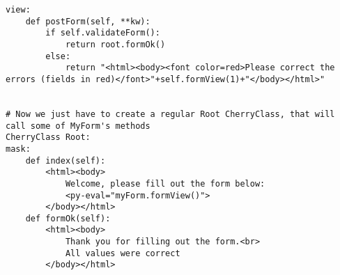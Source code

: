 \begin{verbatim}
view:
    def postForm(self, **kw):
        if self.validateForm():
            return root.formOk()
        else:
            return "<html><body><font color=red>Please correct the errors (fields in red)</font>"+self.formView(1)+"</body></html>"


# Now we just have to create a regular Root CherryClass, that will call some of MyForm's methods
CherryClass Root:
mask:
    def index(self):
        <html><body>
            Welcome, please fill out the form below:
            <py-eval="myForm.formView()">
        </body></html>
    def formOk(self):
        <html><body>
            Thank you for filling out the form.<br>
            All values were correct
        </body></html>
\end{verbatim}


